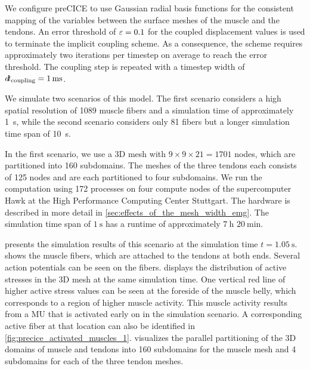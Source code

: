 We configure preCICE to use Gaussian radial basis functions for the consistent mapping of the variables between the surface meshes of the muscle and the tendons. 
An error threshold of $\varepsilon=0.1$ for the coupled displacement values is used to terminate the implicit coupling scheme. As a consequence, the scheme requires approximately two iterations per timestep on average to reach the error threshold. The coupling step is repeated with a timestep width of $\dt_\text{coupling} = \SI{1}{\ms}$.

We simulate two scenarios of this model. The first scenario considers a high spatial resolution of 1089 muscle fibers and a simulation time of approximately \SI{1}{\s}, while the second scenario considers only 81 fibers but a longer simulation time span of \SI{10}{\s}. 

In the first scenario, we use a 3D mesh with $9\times 9 \times 21=1701$ nodes, which are partitioned into 160 subdomains.
The meshes of the three tendons each consists of 125 nodes and are each partitioned to four subdomains. We run the computation using 172 processes on four compute nodes of the supercomputer Hawk at the High Performance Computing Center Stuttgart. The hardware is described in more detail in  \cref{sec:effects_of_the_mesh_width_emg}. The simulation time span of $\SI{1}{\s}$ has a runtime of approximately $\SI{7}{\hour}$ $\SI{20}{\minute}$.

 presents the simulation results of this scenario at the simulation time $t=\SI{1.05}{\s}$.  shows the muscle fibers, which are attached to the tendons at both ends. Several action potentials can be seen on the fibers.  displays the distribution of active stresses in the 3D mesh at the same simulation time. One vertical red line of higher active stress values can be seen at the foreside of the muscle belly, which corresponds to a region of higher muscle activity. This muscle activity results from a MU that is activated early on in the simulation scenario. A corresponding active fiber at that location can also be identified in \cref{fig:precice_activated_muscles_1}.
 visualizes the parallel partitioning of the 3D domains of muscle and tendons into 160 subdomains for the muscle mesh and 4 subdomains for each of the three tendon meshes.

